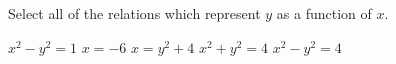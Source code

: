 \documentclass{ximera}
\author{Elizabeth Miller}
\begin{document}
\licenseSZ
\begin{exercise}
Select all of the relations which represent  $y$ as a function of $x$.

\begin{selectAll}
\choice
{
$x^{2} - y^{2} = 1$
}\choice
{
$x = -6$
}\choice
{
$x = y^2 + 4$
}
\choice
{
 $x^2 + y^2 = 4$
}\choice
{
$x^2 - y^2 = 4$
}
\end{selectAll}

\end{exercise}
\end{document}
